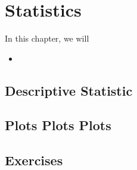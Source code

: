 
\chapter{Statistics}

\begin{summary}
In this chapter, we will 
\begin{itemize}
    \item 
\end{itemize}
\end{summary}

\newpage 

\section{Descriptive Statistic}

\section{Plots Plots Plots}


\section{Exercises} 